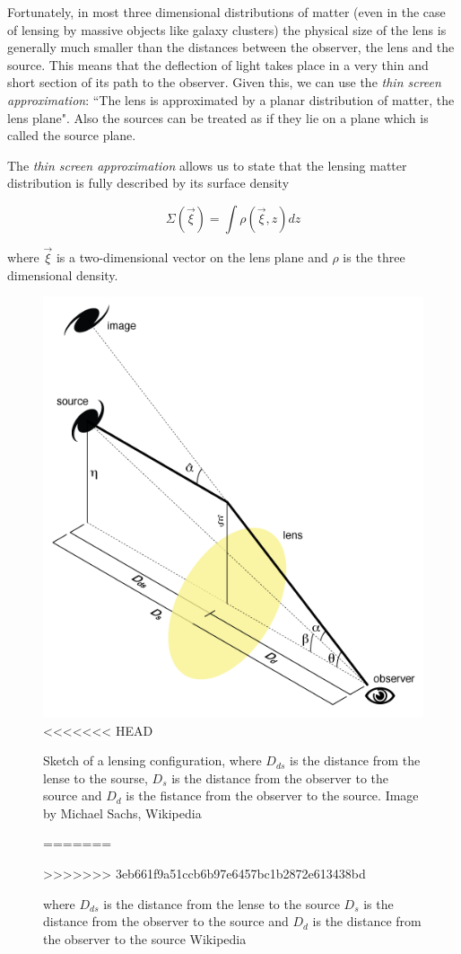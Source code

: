Fortunately, in most three dimensional distributions of matter (even in the case of lensing by massive objects like galaxy clusters) the physical size of the lens is generally much smaller than the distances between the observer, the lens and the source. This means that the deflection of light takes place in a very thin and short section of its path to the observer. Given this, we can use the \textit{thin screen approximation}: ``The lens is approximated by a planar distribution of matter, the lens plane". Also the sources can be treated as if they lie on a plane which is called the source plane.

The \textit{thin screen approximation} allows us to state that the lensing matter distribution is fully described by its surface density

\begin{equation}
\Sigma(\vec{\xi}) = \int \rho (\vec{\xi},z)dz
\end{equation}

where $\vec{\xi}$ is a two-dimensional vector on the lens plane and $\rho$ is the three dimensional density.

\begin{figure}[H]
\centering
\includegraphics[width=12cm]{images/lensing.png}
<<<<<<< HEAD
\caption[Angles in gravitational lensing]{Sketch of a lensing configuration, where $D_{ds}$ is the distance from the lense to the sourse, $D_s$ is the distance from the observer to the source and $D_d$ is the fistance from the observer to the source. Image by Michael Sachs, Wikipedia}
=======
\caption[Angles in gravitational lensing]{where $D_{ds}$ is the distance from the lense to the source $D_s$ is the distance from the observer to the source and $D_d$ is the distance from the observer to the source Wikipedia}
>>>>>>> 3eb661f9a51ccb6b97e6457bc1b2872e613438bd
\end{figure}


